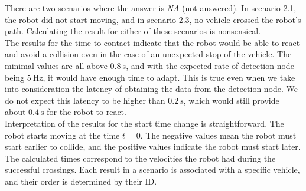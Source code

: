         \noindent There are two scenarios where the answer is \emph{NA} (not answered). In scenario 2.1, the robot did not start moving, and in scenario 2.3, no vehicle crossed the robot's path. Calculating the result for either of these scenarios is nonsensical.\\
        The results for the time to contact indicate that the robot would be able to react and avoid a collision even in the case of an unexpected stop of the vehicle. The minimal values are all above $0.8\:\si{\s}$, and with the expected rate of detection node being $5\:\si{\Hz}$, it would have enough time to adapt. This is true even when we take into consideration the latency of obtaining the data from the detection node. We do not expect this latency to be higher than $0.2\:\si{\s}$, which would still provide about $0.4\:\si{\s}$ for the robot to react.\\
        Interpretation of the results for the start time change is straightforward. The robot starts moving at the time $t=0$. The negative values mean the robot must start earlier to collide, and the positive values indicate the robot must start later. The calculated times correspond to the velocities the robot had during the successful crossings. Each result in a scenario is associated with a specific vehicle, and their order is determined by their ID.
